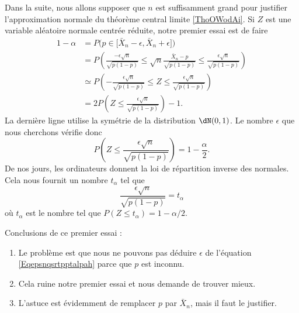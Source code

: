 Dans la suite, nous allons supposer que \( n\) est suffisamment grand pour justifier l'approximation normale du théorème central limite \ref{ThoOWodAi}. Si \( Z\) est une variable aléatoire normale centrée réduite, notre premier essai est de faire
\begin{subequations}
    \begin{align}
        1-\alpha&=P\big( p\in\mathopen[ \bar X_n-\epsilon , \bar X_n+\epsilon \mathclose] \big) \label{subEqumaleftLthe}\\
        &=P\left( \frac{ -\epsilon\sqrt{n} }{ \sqrt{p(1-p)} }\leq \sqrt{n}\frac{ \bar X_n-p }{ \sqrt{p(1-p)} }\leq \frac{ \epsilon\sqrt{n} }{ \sqrt{p(1-p)} } \right)\\
        &\simeq P\left( -\frac{ \epsilon\sqrt{n} }{ \sqrt{p(1-p)} }\leq Z\leq \frac{ \epsilon\sqrt{n} }{ \sqrt{p(1-p)} } \right)\\
        &=2P\left( Z\leq \frac{ \epsilon\sqrt{n} }{ \sqrt{p(1-p)} } \right)-1.
    \end{align}
\end{subequations}
La dernière ligne utilise la symétrie de la distribution \( \dN(0,1)\). Le nombre \( \epsilon\) que nous cherchons vérifie donc
\begin{equation}
    P\left( Z\leq \frac{ \epsilon\sqrt{n} }{ \sqrt{p(1-p)} } \right)=1-\frac{ \alpha }{2}.
\end{equation}
De nos jours, les ordinateurs donnent la loi de répartition inverse des normales. Cela nous fournit un nombre \( t_{\alpha}\) tel que
\begin{equation}    \label{Eqepsnqsrtpptalpah}
    \frac{ \epsilon\sqrt{n} }{ \sqrt{p(1-p)} }=t_{\alpha}
\end{equation}
où \( t_{\alpha}\) est le nombre tel que \( P(Z\leq t_{\alpha})=1-\alpha/2\). 

Conclusions de ce premier essai :
\begin{enumerate}
    \item

Le problème est que nous ne pouvons pas déduire \( \epsilon\) de l'équation \eqref{Eqepsnqsrtpptalpah} parce que \( p\) est inconnu.

\item
Cela ruine notre premier essai et nous demande de trouver mieux.

\item
L'astuce est évidemment de remplacer \( p\) par \( \bar X_n\), mais il faut le justifier. 
        
\end{enumerate}

